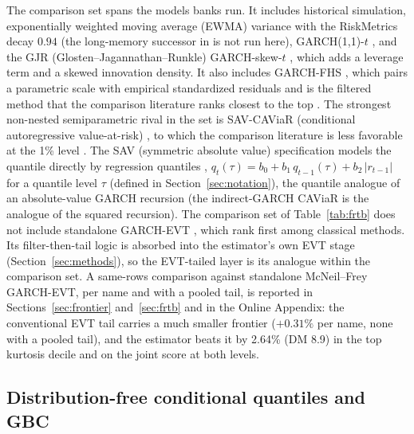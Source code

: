 \documentclass[11pt]{article}
\theoremstyle{remark}
\begin{document}
The comparison set spans the models banks run. It includes historical simulation, exponentially weighted moving average (EWMA) variance with the RiskMetrics decay $0.94$ \citep{riskmetrics1996} (the long-memory successor in \citealp{zumbach2007} is not run here), GARCH(1,1)-$t$ \citep{bollerslev1986, bollerslev1987}, and the GJR (Glosten--Jagannathan--Runkle) GARCH-skew-$t$ \citep{glosten1993, hansen1994ARCD}, which adds a leverage term and a skewed innovation density. It also includes GARCH-FHS \citep{baroneadesi1999fhs, hullwhite1998}, which pairs a parametric scale with empirical standardized residuals and is the filtered method that the comparison literature ranks closest to the top \citep{kuester2006, nietoruiz2016}. The strongest non-nested semiparametric rival in the set is SAV-CAViaR (conditional autoregressive value-at-risk) \citep{engle2004caviar}, to which the comparison literature is less favorable at the 1\% level \citep{kuester2006}.
The SAV (symmetric absolute value) specification models the quantile
directly by regression quantiles \citep{koenker1978},
$q_t(\tau) = b_0 + b_1\, q_{t-1}(\tau) + b_2\,|r_{t-1}|$ for a quantile level $\tau$ (defined in Section~\ref{sec:notation}), the
quantile analogue of an absolute-value GARCH recursion (the indirect-GARCH CAViaR is the analogue of the squared recursion).
The comparison set of Table~\ref{tab:frtb} does not include standalone GARCH-EVT \citep{mcneilfrey2000}, which
\citet{kuester2006} rank first among classical methods. Its
filter-then-tail logic is absorbed into the estimator's own EVT
stage (Section~\ref{sec:methods}), so the EVT-tailed layer is its
analogue within the comparison set. A same-rows comparison against standalone McNeil--Frey GARCH-EVT, per name and with a pooled tail, is reported in Sections~\ref{sec:frontier} and~\ref{sec:frtb} and in the Online Appendix: the conventional EVT tail carries a much smaller frontier ($+0.31\%$ per name, none with a pooled tail), and the estimator beats it by 2.64\% (DM 8.9) in the top kurtosis decile and on the joint score at both levels.

\subsection{Distribution-free conditional quantiles and GBC}
\end{document}
